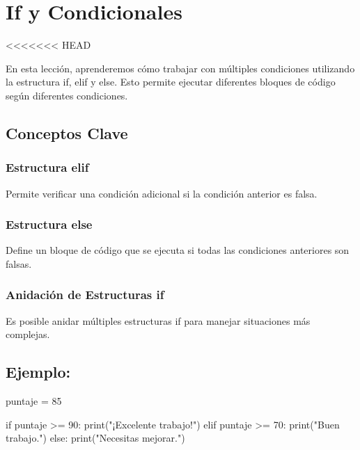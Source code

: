 \documentclass[
  a4paper,
  DIV=11,
  numbers=noendperiod,
  onepage,
  openany]{scrreprt}
\newenvironment{Shaded}{\begin{snugshade}}{\end{snugshade}}
\newcommand{\BuiltInTok}[1]{\textcolor[rgb]{0.00,0.23,0.31}{#1}}
\newcommand{\ControlFlowTok}[1]{\textcolor[rgb]{0.00,0.23,0.31}{#1}}
\newcommand{\DecValTok}[1]{\textcolor[rgb]{0.68,0.00,0.00}{#1}}
\newcommand{\NormalTok}[1]{\textcolor[rgb]{0.00,0.23,0.31}{#1}}
\newcommand{\OperatorTok}[1]{\textcolor[rgb]{0.37,0.37,0.37}{#1}}
\newcommand{\StringTok}[1]{\textcolor[rgb]{0.13,0.47,0.30}{#1}}
\begin{document}
\hypertarget{if-y-condicionales}{%
\chapter{If y Condicionales}\label{if-y-condicionales}}

\textless\textless\textless\textless\textless\textless\textless{} HEAD

En esta lección, aprenderemos cómo trabajar con múltiples condiciones
utilizando la estructura if, elif y else. Esto permite ejecutar
diferentes bloques de código según diferentes condiciones.

\hypertarget{conceptos-clave-30}{%
\section{Conceptos Clave}\label{conceptos-clave-30}}

\hypertarget{estructura-elif}{%
\subsection{Estructura elif}\label{estructura-elif}}

Permite verificar una condición adicional si la condición anterior es
falsa.

\hypertarget{estructura-else}{%
\subsection{Estructura else}\label{estructura-else}}

Define un bloque de código que se ejecuta si todas las condiciones
anteriores son falsas.

\hypertarget{anidaciuxf3n-de-estructuras-if}{%
\subsection{Anidación de Estructuras
if}\label{anidaciuxf3n-de-estructuras-if}}

Es posible anidar múltiples estructuras if para manejar situaciones más
complejas.

\hypertarget{ejemplo-30}{%
\section{Ejemplo:}\label{ejemplo-30}}

\begin{Shaded}
\begin{Highlighting}[]
\NormalTok{puntaje }\OperatorTok{=} \DecValTok{85}

\ControlFlowTok{if}\NormalTok{ puntaje }\OperatorTok{\textgreater{}=} \DecValTok{90}\NormalTok{:}
    \BuiltInTok{print}\NormalTok{(}\StringTok{"¡Excelente trabajo!"}\NormalTok{)}
\ControlFlowTok{elif}\NormalTok{ puntaje }\OperatorTok{\textgreater{}=} \DecValTok{70}\NormalTok{:}
    \BuiltInTok{print}\NormalTok{(}\StringTok{"Buen trabajo."}\NormalTok{)}
\ControlFlowTok{else}\NormalTok{:}
    \BuiltInTok{print}\NormalTok{(}\StringTok{"Necesitas mejorar."}\NormalTok{)}
\end{Highlighting}
\end{Shaded}
\end{document}
